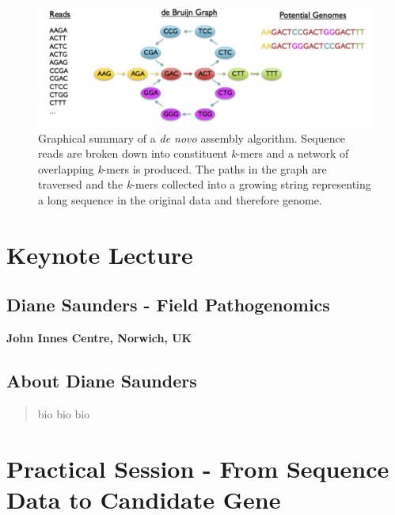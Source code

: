 \documentclass[12pt,]{book}
\begin{document}
\begin{figure}
\includegraphics[width=7.01in]{assets/algo} \caption{Graphical summary of a \emph{de novo} assembly algorithm.
Sequence reads are broken down into constituent \emph{k}-mers and a
network of overlapping \emph{k}-mers is produced. The paths in the graph
are traversed and the \emph{k}-mers collected into a growing string
representing a long sequence in the original data and therefore genome.}\label{fig:mainbio}
\end{figure}

\section*{Keynote Lecture}\label{keynote-lecture-1}

\subsection*{Diane Saunders - Field
Pathogenomics}\label{diane-saunders---field-pathogenomics}

\textbf{John Innes Centre, Norwich, UK}

\subsection*{About Diane Saunders}\label{about-diane-saunders}

\begin{quote}
bio bio bio
\end{quote}

\section*{Practical Session - From Sequence Data to Candidate
Gene}\label{practical-session---from-sequence-data-to-candidate-gene}
\end{document}
